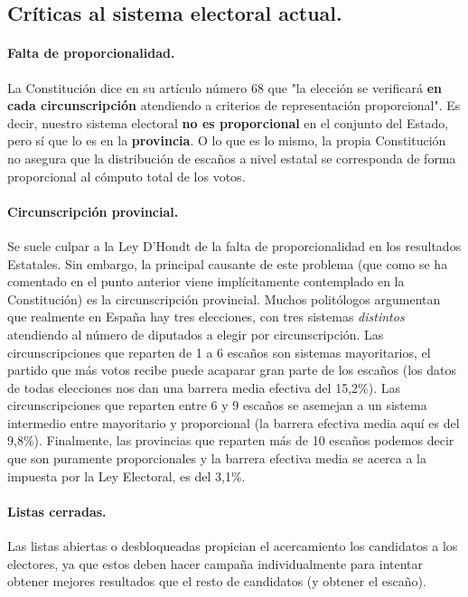 \documentclass[11pt]{article}
\begin{document}
	\subsection{Críticas al sistema electoral actual.}
	
	\paragraph{Falta de proporcionalidad.}
	
	La Constitución dice en su artículo número 68 que "la elección se verificará \textbf{en cada circunscripción} atendiendo a criterios de representación proporcional". Es decir, nuestro sistema electoral \textbf{no es proporcional} en el conjunto del Estado, pero sí que lo es en la \textbf{provincia}. O lo que es lo mismo, la propia Constitución no asegura que la distribución de escaños a nivel estatal se corresponda de forma proporcional al cómputo total de los votos.
	
	\paragraph{Circunscripción provincial.}
	
	Se suele culpar a la Ley D'Hondt de la falta de proporcionalidad en los resultados Estatales. Sin embargo, la principal causante de este problema (que como se ha comentado en el punto anterior viene implícitamente contemplado en la Constitución) es la circunscripción provincial. Muchos politólogos argumentan que realmente en España hay tres elecciones, con tres sistemas \textit{distintos} atendiendo al número de diputados a elegir por circunscripción. Las circunscripciones que reparten de 1 a 6 escaños son sistemas mayoritarios, el partido que más votos recibe puede acaparar gran parte de los escaños (los datos de todas elecciones nos dan una barrera media efectiva del 15,2\%). Las circunscripciones que reparten entre 6 y 9 escaños se asemejan a un sistema intermedio entre mayoritario y proporcional (la barrera efectiva media aquí es del 9,8\%). Finalmente, las provincias que reparten más de 10 escaños podemos decir que son puramente proporcionales y la barrera efectiva media se acerca a la impuesta por la Ley Electoral, es del 3,1\%.
	
	\paragraph{Listas cerradas.}
	
	Las listas abiertas o desbloqueadas propician el acercamiento los candidatos a los electores, ya que estos deben hacer campaña individualmente para intentar obtener mejores resultados que el resto de candidatos (y obtener el escaño).
	
\end{document}
